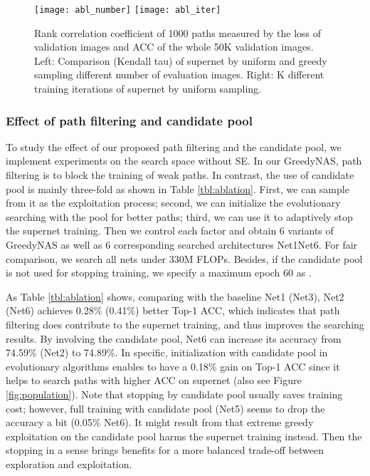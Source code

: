 \documentclass[10pt,twocolumn,letterpaper]{article}
\begin{document}
\begin{figure}[t]
	\centering
	\subfigure
	{\texttt{[image: abl\_number]}}
	\subfigure
	{\texttt{[image: abl\_iter]}}
	\vspace{-4mm}
	\caption{Rank correlation coefficient of 1000 paths measured by the loss of  validation images and ACC of the whole 50K validation images. Left:  Comparison (Kendall tau) of supernet by uniform and greedy sampling \wrt different number  of evaluation images. Right: K \wrt different training iterations of supernet by uniform sampling. }
	\label{fig:ablation}
\vspace{-4mm}
\end{figure}


\subsubsection{Effect of path filtering and candidate pool}
To study the effect of our proposed path filtering and the candidate pool, we implement experiments on the search space without SE. In our GreedyNAS, path filtering is to block the training of weak paths. In contrast, the use of candidate pool is mainly three-fold as shown in Table \ref{tbl:ablation}. First, we can sample from it 
as the exploitation process; second, we can initialize the evolutionary searching with the pool for better paths; third, we can use it to adaptively stop the supernet training. Then we control each factor and obtain 6 variants of GreedyNAS as well as 6 corresponding searched architectures Net1Net6. For fair comparison, we search all nets under 330M FLOPs. Besides, if the candidate pool is not used for stopping training, we specify a maximum epoch 60 as \cite{scarletnas}. 

As Table \ref{tbl:ablation} shows, comparing with the baseline Net1 (Net3), Net2 (Net6) achieves 0.28\% (0.41\%) better Top-1 ACC, which indicates that path filtering does contribute to the supernet training, and thus improves the searching results. By involving the candidate pool, Net6 can increase its accuracy from 74.59\% (Net2) to 74.89\%. In specific, initialization with candidate pool in evolutionary algorithms enables to have a 0.18\% gain on Top-1 ACC since it helps to search paths with higher ACC on supernet (also see Figure \ref{fig:population}). Note that stopping by candidate pool usually saves training cost; however, full training with candidate pool (Net5) seems to drop the accuracy a bit (0.05\% \wrt Net6). It might result from that extreme greedy exploitation on the candidate pool harms the supernet training instead. Then the stopping in a sense brings benefits for a more balanced trade-off between exploration and exploitation. 
\end{document}
